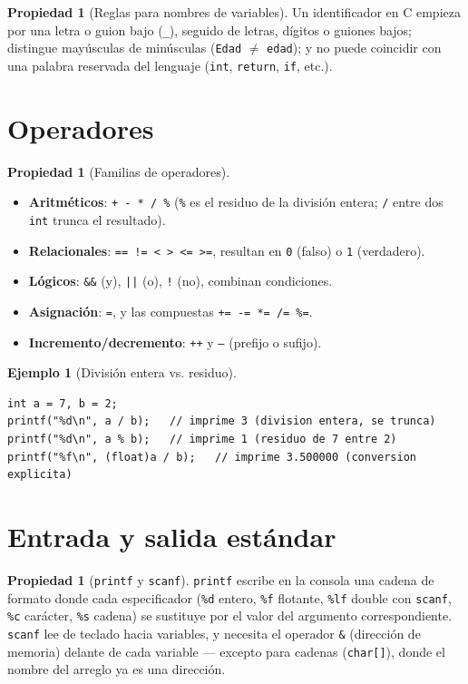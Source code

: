 \documentclass[11pt,letterpaper]{article}
\theoremstyle{definition}
\newtheorem{ejemplo}[definicion]{Ejemplo}
\newtheorem{propiedad}[definicion]{Propiedad}
\begin{document}
\begin{propiedad}[Reglas para nombres de variables]
Un identificador en C empieza por una letra o guion bajo (\texttt{\_}), seguido de letras, dígitos
o guiones bajos; distingue mayúsculas de minúsculas (\texttt{Edad} $\neq$ \texttt{edad}); y no
puede coincidir con una palabra reservada del lenguaje (\texttt{int}, \texttt{return}, \texttt{if},
etc.).
\end{propiedad}

\section{Operadores}

\begin{propiedad}[Familias de operadores]
\begin{itemize}[leftmargin=1.2cm]
  \item \textbf{Aritméticos}: \texttt{+ - * / \%} (\texttt{\%} es el residuo de la división
        entera; \texttt{/} entre dos \texttt{int} trunca el resultado).
  \item \textbf{Relacionales}: \texttt{== != < > <= >=}, resultan en \texttt{0} (falso) o
        \texttt{1} (verdadero).
  \item \textbf{Lógicos}: \texttt{\&\&} (y), \texttt{||} (o), \texttt{!} (no), combinan
        condiciones.
  \item \textbf{Asignación}: \texttt{=}, y las compuestas \texttt{+= -= *= /= \%=}.
  \item \textbf{Incremento/decremento}: \texttt{++} y \texttt{--} (prefijo o sufijo).
\end{itemize}
\end{propiedad}

\begin{ejemplo}[División entera vs. residuo]
\begin{lstlisting}
int a = 7, b = 2;
printf("%d\n", a / b);   // imprime 3 (division entera, se trunca)
printf("%d\n", a % b);   // imprime 1 (residuo de 7 entre 2)
printf("%f\n", (float)a / b);   // imprime 3.500000 (conversion explicita)
\end{lstlisting}
\end{ejemplo}

\section{Entrada y salida estándar}

\begin{propiedad}[\texttt{printf} y \texttt{scanf}]
\texttt{printf} escribe en la consola una cadena de formato donde cada especificador (\texttt{\%d}
entero, \texttt{\%f} flotante, \texttt{\%lf} double con \texttt{scanf}, \texttt{\%c} carácter,
\texttt{\%s} cadena) se sustituye por el valor del argumento correspondiente. \texttt{scanf} lee de
teclado hacia variables, y necesita el operador \texttt{\&} (dirección de memoria) delante de cada
variable --- excepto para cadenas (\texttt{char[]}), donde el nombre del arreglo ya es una
dirección.
\end{propiedad}
\end{document}
